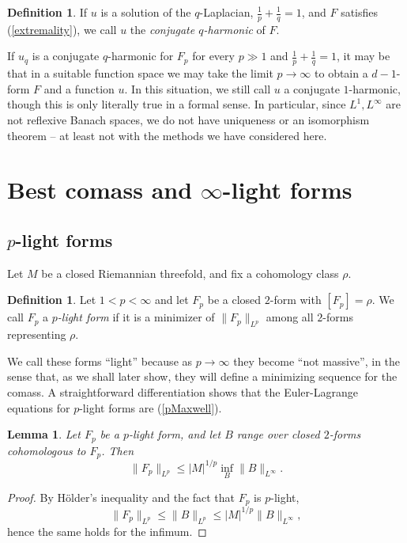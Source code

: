 \documentclass[reqno,11pt]{amsart}
\newcommand{\dfn}[1]{\emph{#1}\index{#1}}
\newtheorem{lemma}[theorem]{Lemma}
\theoremstyle{definition}
\newtheorem{definition}[theorem]{Definition}
\numberwithin{equation}{section}
\begin{document}
\begin{definition}
If $u$ is a solution of the $q$-Laplacian, $\frac{1}{p} + \frac{1}{q} = 1$, and $F$ satisfies (\ref{extremality}), we call $u$ the \dfn{conjugate $q$-harmonic} of $F$.
\end{definition}

If $u_q$ is a conjugate $q$-harmonic for $F_p$ for every $p \gg 1$ and $\frac{1}{p} + \frac{1}{q} = 1$, it may be that in a suitable function space we may take the limit $p \to \infty$ to obtain a $d-1$-form $F$ and a function $u$.
In this situation, we still call $u$ a conjugate $1$-harmonic, though this is only literally true in a formal sense.
In particular, since $L^1, L^\infty$ are not reflexive Banach spaces, we do not have uniqueness or an isomorphism theorem -- at least not with the methods we have considered here.


\section{Best comass and \texorpdfstring{$\infty$-light forms}{infinity-light forms}}
\subsection{\texorpdfstring{$p$-light forms}{p-light forms}}
Let $M$ be a closed Riemannian threefold, and fix a cohomology class $\rho$.

\begin{definition}
Let $1 < p < \infty$ and let $F_p$ be a closed $2$-form with $[F_p] = \rho$.
We call $F_p$ a \dfn{$p$-light form} if it is a minimizer of $\|F_p\|_{L^p}$ among all $2$-forms representing $\rho$.
\end{definition}

We call these forms ``light'' because as $p \to \infty$ they become ``not massive'', in the sense that, as we shall later show, they will define a minimizing sequence for the comass.
A straightforward differentiation shows that the Euler-Lagrange equations for $p$-light forms are (\ref{pMaxwell}).

\begin{lemma}
Let $F_p$ be a $p$-light form, and let $B$ range over closed $2$-forms cohomologous to $F_p$. Then
\begin{equation}\label{infinity magnetic rules p magnetic}
	\|F_p\|_{L^p} \leq |M|^{1/p} \inf_B \|B\|_{L^\infty}.
\end{equation}
\end{lemma}
\begin{proof}
By H\"older's inequality and the fact that $F_p$ is $p$-light,
$$\|F_p\|_{L^p} \leq \|B\|_{L^p} \leq |M|^{1/p} \|B\|_{L^\infty},$$
hence the same holds for the infimum.
\end{proof}
\end{document}
